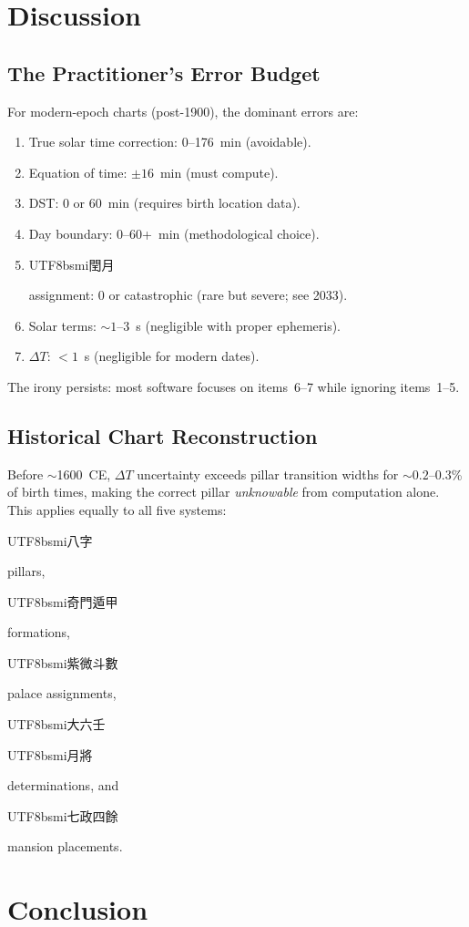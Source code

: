 \documentclass[10pt,a4paper]{article}
\newcommand{\zh}[1]{\begin{CJK}{UTF8}{bsmi}#1\end{CJK}}
\begin{document}
\section{Discussion}
\label{sec:discussion}

\subsection{The Practitioner's Error Budget}

For modern-epoch charts (post-1900), the dominant errors are:

\begin{enumerate}
  \item True solar time correction: 0--176~min (avoidable).
  \item Equation of time: $\pm 16$~min (must compute).
  \item DST: 0 or 60~min (requires birth location data).
  \item Day boundary: 0--60+~min (methodological choice).
  \item \zh{閏月} assignment: 0 or catastrophic (rare but severe; see 2033).
  \item Solar terms: $\sim 1$--$3$~s (negligible with proper ephemeris).
  \item $\Delta T$: $< 1$~s (negligible for modern dates).
\end{enumerate}

The irony persists: most software focuses on items~6--7 while ignoring
items~1--5.

\subsection{Historical Chart Reconstruction}

Before $\sim$1600~CE, $\Delta T$ uncertainty exceeds pillar transition
widths for $\sim 0.2$--$0.3$\% of birth times, making the correct pillar
\emph{unknowable} from computation alone. This applies equally to all five
systems: \zh{八字} pillars, \zh{奇門遁甲} formations, \zh{紫微斗數}
palace assignments, \zh{大六壬} \zh{月將} determinations, and
\zh{七政四餘} mansion placements.


\section{Conclusion}
\label{sec:conclusion}
\end{document}
